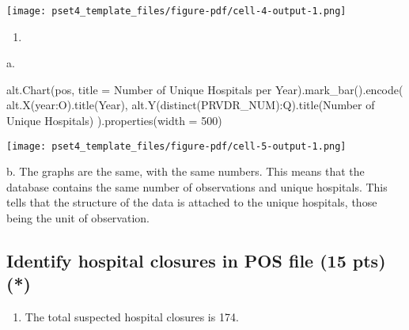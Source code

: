 \documentclass[
  letterpaper,
  DIV=11,
  numbers=noendperiod]{scrartcl}
\newenvironment{Shaded}{\begin{snugshade}}{\end{snugshade}}
\newcommand{\DecValTok}[1]{\textcolor[rgb]{0.68,0.00,0.00}{#1}}
\newcommand{\NormalTok}[1]{\textcolor[rgb]{0.00,0.23,0.31}{#1}}
\newcommand{\OperatorTok}[1]{\textcolor[rgb]{0.37,0.37,0.37}{#1}}
\newcommand{\StringTok}[1]{\textcolor[rgb]{0.13,0.47,0.30}{#1}}
\providecommand{\tightlist}{%
  \setlength{\itemsep}{0pt}\setlength{\parskip}{0pt}}\usepackage{longtable,booktabs,array}
\begin{document}
\texttt{[image: pset4\_template\_files/figure-pdf/cell-4-output-1.png]}

\begin{enumerate}
\def\labelenumi{\arabic{enumi}.}
\setcounter{enumi}{3}
\tightlist
\item
\end{enumerate}

\hfill\break
a.

\begin{Shaded}
\begin{Highlighting}[]
\NormalTok{alt.Chart(pos, title }\OperatorTok{=} \StringTok{\textquotesingle{}Number of Unique Hospitals per Year\textquotesingle{}}\NormalTok{).mark\_bar().encode(}
\NormalTok{  alt.X(}\StringTok{\textquotesingle{}year:O\textquotesingle{}}\NormalTok{).title(}\StringTok{\textquotesingle{}Year\textquotesingle{}}\NormalTok{),}
\NormalTok{  alt.Y(}\StringTok{\textquotesingle{}distinct(PRVDR\_NUM):Q\textquotesingle{}}\NormalTok{).title(}\StringTok{\textquotesingle{}Number of Unique Hospitals\textquotesingle{}}\NormalTok{)}
\NormalTok{).properties(width }\OperatorTok{=} \DecValTok{500}\NormalTok{)}
\end{Highlighting}
\end{Shaded}

\texttt{[image: pset4\_template\_files/figure-pdf/cell-5-output-1.png]}

\hfill\break
b. The graphs are the same, with the same numbers. This means that the
database contains the same number of observations and unique hospitals.
This tells that the structure of the data is attached to the unique
hospitals, those being the unit of observation.

\subsection{Identify hospital closures in POS file (15 pts)
(*)}\label{identify-hospital-closures-in-pos-file-15-pts}

\begin{enumerate}
\def\labelenumi{\arabic{enumi}.}
\tightlist
\item
  The total suspected hospital closures is 174.
\end{enumerate}
\end{document}
